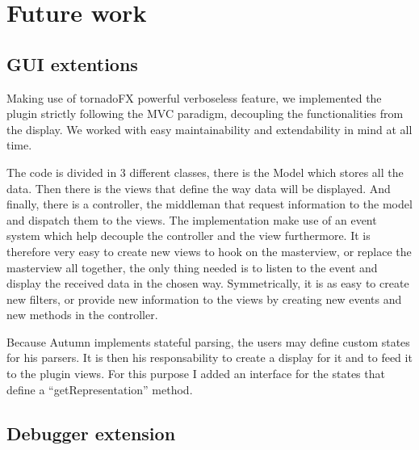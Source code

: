 %
\chapter{Future work}
%
	
	\section{GUI extentions}
	Making use of tornadoFX powerful verboseless feature, we implemented the plugin strictly following the MVC paradigm, decoupling the functionalities from the display. We worked with easy maintainability and extendability in mind at all time. 

	The code is divided in 3 different classes, there is the Model which stores all the data. Then there is the views that define the way data will be displayed. And finally, there is a controller, the middleman that request information to the model and dispatch them to the views. The implementation make use of an event system which help decouple the controller and the view furthermore. It is therefore very easy to create new views to hook on the masterview, or replace the masterview all together, the only thing needed is to listen to the event and display the received data in the chosen way. Symmetrically, it is as easy to create new filters, or provide new information to the views by creating new events and new methods in the controller.

	Because Autumn implements stateful parsing, the users may define custom states for his parsers. It is then his responsability to create a display for it and to feed it to the plugin views. For this purpose I added an interface for the states that define a ``getRepresentation'' method.

	\section{Debugger extension}

